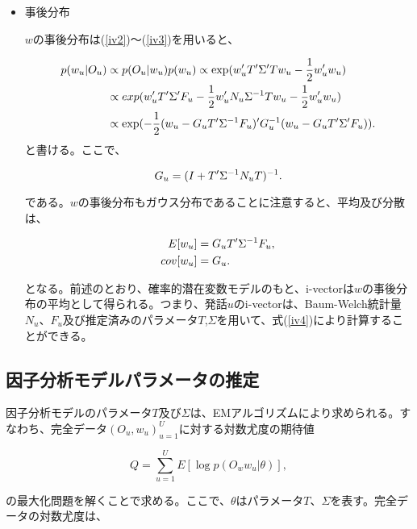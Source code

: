 \begin{itemize}
\item 事後分布\par
$w$の事後分布は(\ref{iv2})〜(\ref{iv3})を用いると、

\begin{align}
p(w_u|O_u) &\propto p(O_u|w_u)p(w_u)\propto \exp(w_u^\prime T^\prime \Sigma^\prime Tw_u-\frac{1}{2}w_u^\prime w_u) \notag \\ 
 &\propto exp(w_u^\prime T^\prime \Sigma^\prime F_u-\frac{1}{2}w_u^\prime N_u\Sigma^{-1}Tw_u-\frac{1}{2}w_u^\prime w_u) \notag \\ 
 &\propto \exp(-\frac{1}{2}(w_u-G_uT^\prime\Sigma^{-1}F_u)^\prime G_u^{-1}(w_u-G_uT^\prime \Sigma^\prime F_u)). \notag
\end{align}
と書ける。ここで、

\begin{equation}
G_u=(I+T^\prime \Sigma^{-1}N_u T)^{-1}. \notag
\end{equation}

である。$w$の事後分布もガウス分布であることに注意すると、平均及び分散は、

\begin{align}
\label{iv4}
E[w_u] &=G_uT^\prime \Sigma^{-1}F_u, \\
cov[w_u] &=G_u. \notag
\end{align}

となる。前述のとおり、確率的潜在変数モデルのもと、i-vectorは$w$の事後分布の平均として得られる。つまり、発話$u$のi-vectorは、Baum-Welch統計量$N_u$、$F_u$及び推定済みのパラメータ$T$,$\Sigma$を用いて、式(\ref{iv4})により計算することができる。

\end{itemize}


\subsection{因子分析モデルパラメータの推定}
因子分析モデルのパラメータ$T$及び$\Sigma$は、EMアルゴリズムにより求められる。すなわち、完全データ${(O_u,w_u)}_{u=1}^{U}$に対する対数尤度の期待値

\begin{equation}
\label{iv5}
Q=\sum_{u=1}^{U}E[\log p(O_ww_u|\theta)],
\end{equation}

の最大化問題を解くことで求める。ここで、$\theta$はパラメータ$T$、$\Sigma$を表す。完全データの対数尤度は、


